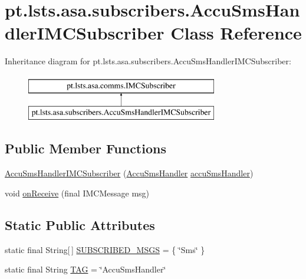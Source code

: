 \hypertarget{classpt_1_1lsts_1_1asa_1_1subscribers_1_1AccuSmsHandlerIMCSubscriber}{}\section{pt.\+lsts.\+asa.\+subscribers.\+Accu\+Sms\+Handler\+I\+M\+C\+Subscriber Class Reference}
\label{classpt_1_1lsts_1_1asa_1_1subscribers_1_1AccuSmsHandlerIMCSubscriber}
Inheritance diagram for pt.\+lsts.\+asa.\+subscribers.\+Accu\+Sms\+Handler\+I\+M\+C\+Subscriber\+:\begin{figure}[H]
\begin{center}
\leavevmode
\includegraphics[height=2.000000cm]{classpt_1_1lsts_1_1asa_1_1subscribers_1_1AccuSmsHandlerIMCSubscriber}
\end{center}
\end{figure}
\subsection*{Public Member Functions}
\begin{DoxyCompactItemize}
\item 
\hyperlink{classpt_1_1lsts_1_1asa_1_1subscribers_1_1AccuSmsHandlerIMCSubscriber_a178f2175445cf68cae1235df9820ccde}{Accu\+Sms\+Handler\+I\+M\+C\+Subscriber} (\hyperlink{classpt_1_1lsts_1_1asa_1_1handlers_1_1AccuSmsHandler}{Accu\+Sms\+Handler} \hyperlink{classpt_1_1lsts_1_1asa_1_1subscribers_1_1AccuSmsHandlerIMCSubscriber_aabfa489d410eab1aeb6f3cb5f74c6316}{accu\+Sms\+Handler})
\item 
void \hyperlink{classpt_1_1lsts_1_1asa_1_1subscribers_1_1AccuSmsHandlerIMCSubscriber_af9e61b3e7a2367bed897a9b7c8f1e0c9}{on\+Receive} (final I\+M\+C\+Message msg)
\end{DoxyCompactItemize}
\subsection*{Static Public Attributes}
\begin{DoxyCompactItemize}
\item 
static final String\mbox{[}$\,$\mbox{]} \hyperlink{classpt_1_1lsts_1_1asa_1_1subscribers_1_1AccuSmsHandlerIMCSubscriber_aff3ba7434ed0b051563cca42a6299401}{S\+U\+B\+S\+C\+R\+I\+B\+E\+D\+\_\+\+M\+S\+G\+S} = \{ \char`\"{}Sms\char`\"{} \}
\item 
static final String \hyperlink{classpt_1_1lsts_1_1asa_1_1subscribers_1_1AccuSmsHandlerIMCSubscriber_aa3a344766522e3457edc9f30d57bd508}{T\+A\+G} = \char`\"{}Accu\+Sms\+Handler\char`\"{}
\end{DoxyCompactItemize}
